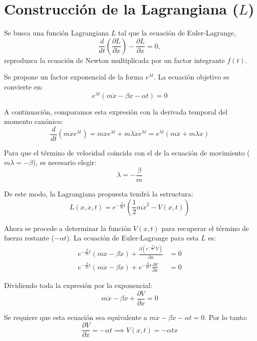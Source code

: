 \documentclass[12pt, a4paper]{article}
\begin{document}
\section*{Construcción de la Lagrangiana ($L$)}

Se busca una función Lagrangiana $L$ tal que la ecuación de Euler-Lagrange,
\[
\frac{d}{dt}\left(\frac{\partial L}{\partial \dot{x}}\right) - \frac{\partial L}{\partial x} = 0,
\]
reproduzca la ecuación de Newton multiplicada por un factor integrante $f(t)$.

Se propone un factor exponencial de la forma $e^{\lambda t}$. La ecuación objetivo se convierte en:
\begin{equation}
    e^{\lambda t}(m\ddot{x} - \beta\dot{x} - \alpha t) = 0
\end{equation}

A continuación, comparamos esta expresión con la derivada temporal del momento canónico:
\[
\frac{d}{dt}(m\dot{x}e^{\lambda t}) = m\ddot{x}e^{\lambda t} + m\lambda\dot{x}e^{\lambda t} = e^{\lambda t}(m\ddot{x} + m\lambda\dot{x})
\]

Para que el término de velocidad coincida con el de la ecuación de movimiento ($m\lambda = -\beta$), es necesario elegir:
\begin{equation}
    \lambda = -\frac{\beta}{m}
\end{equation}

De este modo, la Lagrangiana propuesta tendrá la estructura:
\begin{equation}
    L(x, \dot{x}, t) = e^{-\frac{\beta}{m}t} \left( \frac{1}{2}m\dot{x}^2 - V(x,t) \right)
\end{equation}

Ahora se procede a determinar la función $V(x,t)$ para recuperar el término de fuerza restante ($-\alpha t$). La ecuación de Euler-Lagrange para esta $L$ es:
\begin{align*}
    e^{-\frac{\beta}{m}t}(m\ddot{x} - \beta\dot{x}) + \frac{\partial (e^{-\frac{\beta}{m}t} V)}{\partial x} &= 0 \\
    e^{-\frac{\beta}{m}t}(m\ddot{x} - \beta\dot{x}) + e^{-\frac{\beta}{m}t} \frac{\partial V}{\partial x} &= 0
\end{align*}

Dividiendo toda la expresión por la exponencial:
\[
m\ddot{x} - \beta\dot{x} + \frac{\partial V}{\partial x} = 0
\]

Se requiere que esta ecuación sea equivalente a $m\ddot{x} - \beta\dot{x} - \alpha t = 0$. Por lo tanto:
\[
\frac{\partial V}{\partial x} = -\alpha t \implies V(x,t) = -\alpha t x
\]
\end{document}
